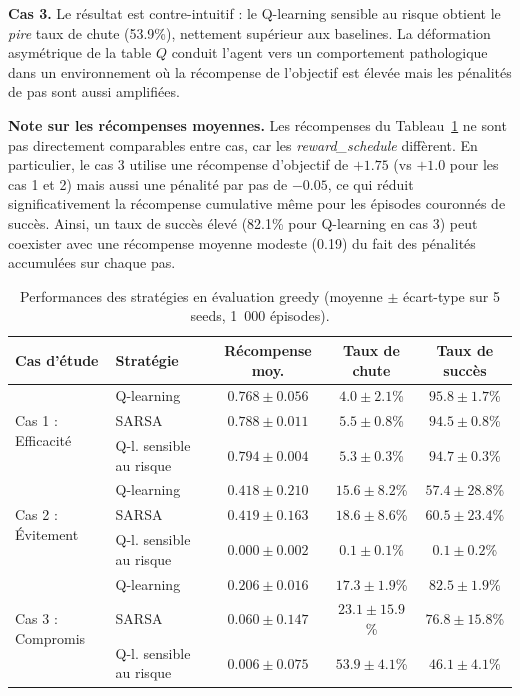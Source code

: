 \documentclass{article}
\begin{document}
\textbf{Cas 3.} Le résultat est contre-intuitif : le Q-learning sensible au risque obtient le \textit{pire} taux de chute (53.9\%), nettement supérieur aux baselines. La déformation asymétrique de la table $Q$ conduit l'agent vers un comportement pathologique dans un environnement où la récompense de l'objectif est élevée mais les pénalités de pas sont aussi amplifiées.

\textbf{Note sur les récompenses moyennes.} Les récompenses du Tableau~\ref{tab:comparaison} ne sont pas directement comparables entre cas, car les \textit{reward\_schedule} diffèrent. En particulier, le cas 3 utilise une récompense d'objectif de $+1.75$ (vs $+1.0$ pour les cas 1 et 2) mais aussi une pénalité par pas de $-0.05$, ce qui réduit significativement la récompense cumulative même pour les épisodes couronnés de succès. Ainsi, un taux de succès élevé (82.1\% pour Q-learning en cas 3) peut coexister avec une récompense moyenne modeste (0.19) du fait des pénalités accumulées sur chaque pas.

\begin{table}[ht]
\centering
\small
\begin{tabular}{llccc}
\toprule
\textbf{Cas d'étude} & \textbf{Stratégie} & \textbf{Récompense moy.} & \textbf{Taux de chute} & \textbf{Taux de succès} \\
\midrule
\multirow{3}{*}{Cas 1 : Efficacité}
  & Q-learning              & $0.768 \pm 0.056$ & $4.0 \pm 2.1$\%  & $95.8 \pm 1.7$\% \\
  & SARSA                   & $0.788 \pm 0.011$ & $5.5 \pm 0.8$\%  & $94.5 \pm 0.8$\% \\
  & Q-l. sensible au risque & $0.794 \pm 0.004$ & $5.3 \pm 0.3$\%  & $94.7 \pm 0.3$\% \\
\midrule
\multirow{3}{*}{Cas 2 : Évitement}
  & Q-learning              & $0.418 \pm 0.210$ & $15.6 \pm 8.2$\% & $57.4 \pm 28.8$\% \\
  & SARSA                   & $0.419 \pm 0.163$ & $18.6 \pm 8.6$\% & $60.5 \pm 23.4$\% \\
  & Q-l. sensible au risque & $0.000 \pm 0.002$ & $\mathbf{0.1 \pm 0.1}$\% & $0.1 \pm 0.2$\% \\
\midrule
\multirow{3}{*}{Cas 3 : Compromis}
  & Q-learning              & $0.206 \pm 0.016$ & $17.3 \pm 1.9$\% & $82.5 \pm 1.9$\% \\
  & SARSA                   & $0.060 \pm 0.147$ & $23.1 \pm 15.9$\%& $76.8 \pm 15.8$\% \\
  & Q-l. sensible au risque & $0.006 \pm 0.075$ & $\mathbf{53.9 \pm 4.1}$\% & $46.1 \pm 4.1$\% \\
\bottomrule
\end{tabular}
\vspace{0.2em}
\caption{Performances des stratégies en évaluation greedy (moyenne $\pm$ écart-type sur 5 seeds, 1~000 épisodes).}
\label{tab:comparaison}
\end{table}
\end{document}
